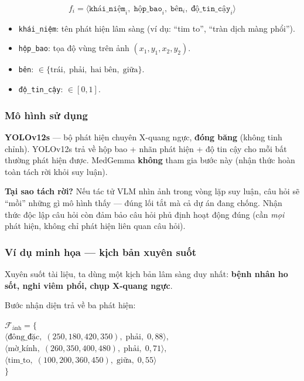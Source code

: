 \documentclass[11pt,a4paper]{article}
\begin{document}
\begin{equation}
f_i = \langle \texttt{khái\_niệm}_i,\; \texttt{hộp\_bao}_i,\; \texttt{bên}_i,\; \texttt{độ\_tin\_cậy}_i \rangle
\label{eq:fact}
\end{equation}

\begin{itemize}[leftmargin=1.5em]
  \item \texttt{khái\_niệm}: tên phát hiện lâm sàng (ví dụ: ``tim to'', ``tràn dịch màng phổi'').
  \item \texttt{hộp\_bao}: tọa độ vùng trên ảnh $(x_1, y_1, x_2, y_2)$.
  \item \texttt{bên}: $\in \{\text{trái},\; \text{phải},\; \text{hai bên},\; \text{giữa}\}$.
  \item \texttt{độ\_tin\_cậy}: $\in [0, 1]$.
\end{itemize}

\subsubsection{Mô hình sử dụng}
\textbf{YOLOv12s} --- bộ phát hiện chuyên X-quang ngực, \textbf{đóng băng} (không tinh chỉnh). YOLOv12s trả về hộp bao + nhãn phát hiện + độ tin cậy cho mỗi bất thường phát hiện được. MedGemma \textbf{không} tham gia bước này (nhận thức hoàn toàn tách rời khỏi suy luận).

\textbf{Tại sao tách rời?} Nếu tác tử VLM nhìn ảnh trong vòng lặp suy luận, câu hỏi sẽ ``mồi'' những gì mô hình thấy --- đúng lối tắt mà cả dự án đang chống. Nhận thức độc lập câu hỏi còn đảm bảo câu hỏi phủ định hoạt động đúng (cần \emph{mọi} phát hiện, không chỉ phát hiện liên quan câu hỏi).

\subsubsection{Ví dụ minh họa --- kịch bản xuyên suốt}
Xuyên suốt tài liệu, ta dùng một kịch bản lâm sàng duy nhất: \textbf{bệnh nhân ho sốt, nghi viêm phổi, chụp X-quang ngực}.

Bước nhận diện trả về ba phát hiện:

\begin{examplebox}
\small
$\mathcal{F}_\text{ảnh} = \{$\\
\quad $\langle \text{đông\_đặc},\; (250, 180, 420, 350),\; \text{phải},\; 0{,}88 \rangle,$\\
\quad $\langle \text{mờ\_kính},\; (260, 350, 400, 480),\; \text{phải},\; 0{,}71 \rangle,$\\
\quad $\langle \text{tim\_to},\; (100, 200, 360, 450),\; \text{giữa},\; 0{,}55 \rangle$\\
$\}$
\end{examplebox}
\end{document}
